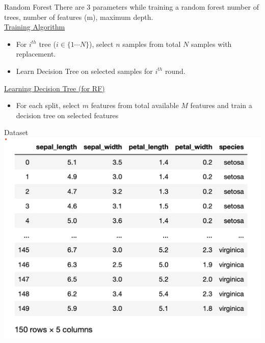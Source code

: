 \documentclass{beamer}
\begin{document}
\begin{frame}{Random Forest}
There are 3 parameters while training a random forest number of trees, number of features (m), maximum depth.\\
\vspace{1cm}
\underline{Training Algorithm}\\
\begin{itemize}
	\item For $i^{th}$ tree ($i \in \{1 \cdots N\}$), select $n$ samples from total $N$ samples with replacement.\\
		
		\item Learn Decision Tree on selected samples for $i^{th}$ round.
		 

\end{itemize}

\underline{Learning Decision Tree (for RF)}\\
\begin{itemize}
	\item For each split, select $m$ features from total available $M$ features and train a decision tree on selected features
\end{itemize}


\end{frame}

\begin{frame}{Dataset }
  \includegraphics[scale=0.5]{../assets/ensemble/diagrams/dataset-iris.png}
\end{frame}
\end{document}
